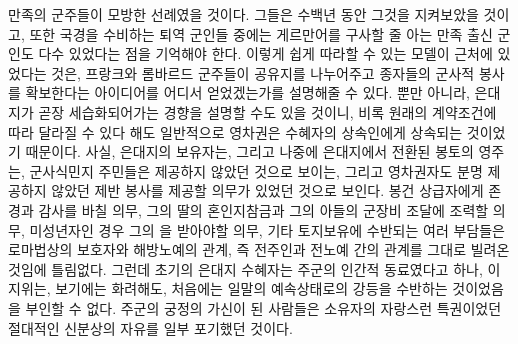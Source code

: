만족의 군주들이 모방한 선례였을 것이다.
그들은 수백년 동안 그것을 지켜보았을 것이고,
또한 국경을 수비하는 퇴역 군인들 중에는
게르만어를 구사할 줄 아는 만족 출신 군인도 다수 있었다는 점을
기억해야 한다.
이렇게 쉽게 따라할 수 있는 모델이 근처에 있었다는 것은,
프랑크와 롬바르드 군주들이
공유지를 나누어주고 종자들의 군사적 봉사를 확보한다는
아이디어를 어디서 얻었겠는가를
설명해줄 수 있다.
뿐만 아니라,
은대지가
곧장 세습화되어가는
경향을
설명할 수도 있을 것이니,
비록 원래의 계약조건에 따라 달라질 수 있다 해도
일반적으로 영차권은 수혜자의 상속인에게 상속되는 것이었기 때문이다.
사실,
은대지의 보유자는,
그리고 나중에 은대지에서 전환된 봉토의 영주는,
군사식민지 주민들은 제공하지 않았던 것으로 보이는,
그리고 영차권자도 분명 제공하지 않았던
제반 봉사를
제공할 의무가 있었던 것으로 보인다.
봉건 상급자에게 존경과 감사를 바칠 의무,
그의 딸의 혼인지참금과 그의 아들의 군장비 조달에 조력할 의무,
미성년자인 경우 그의 을 받아야할 의무,
기타 토지보유에 수반되는 여러 부담들은
로마법상의 보호자와 해방노예의 관계,
즉 전주인과 전노예 간의 관계를
그대로 빌려온 것임에 틀림없다.
그런데 초기의 은대지 수혜자는
주군의 인간적 동료였다고 하나,
이 지위는,
보기에는 화려해도,
처음에는 일말의 예속상태로의 강등을 수반하는 것이었음을
부인할 수 없다.
주군의 궁정의 가신이 된 사람들은
 소유자의 자랑스런 특권이었던
절대적인 신분상의 자유를 일부 포기했던 것이다.

